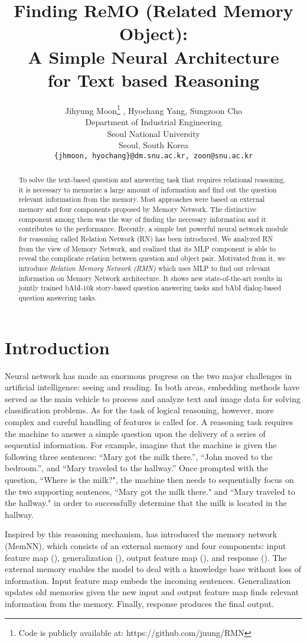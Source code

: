 \documentclass{article} \usepackage{iclr2018_conference,times}
\title{Finding ReMO (Related Memory Object): \\
A Simple Neural Architecture \\ for Text based Reasoning}
\author{Jihyung Moon\thanks{Code is publicly available at: https://github.com/juung/RMN} , Hyochang Yang, Sungzoon Cho \\
Department of Industrial Engineering\\
Seoul National University\\
Seoul, South Korea\\
\texttt{\{jhmoon, hyochang\}@dm.snu.ac.kr, zoon@snu.ac.kr}}
\begin{document}
\maketitle

\begin{abstract}
To solve the text-based question and answering task that requires relational reasoning, it is necessary to memorize a large amount of information and find out the question relevant information from the memory.
Most approaches were based on external memory and four components proposed by Memory Network.
The distinctive component among them was the way of finding the necessary information and it contributes to the performance.
Recently, a simple but powerful neural network module for reasoning called Relation Network (RN) has been introduced. 
We analyzed RN from the view of Memory Network, and realized that its MLP component is able to reveal the complicate relation between question and object pair.
Motivated from it, we introduce \textit{Relation Memory Network (RMN)} which uses MLP to find out relevant information on Memory Network architecture.
It shows new state-of-the-art results in jointly trained bAbI-10k story-based question answering tasks and bAbI dialog-based question answering tasks.
\end{abstract}

\section{Introduction}

Neural network has made an enormous progress on the two major challenges in artificial intelligence: seeing and reading.
In both areas, embedding methods have served as the main vehicle to process and analyze text and image data for solving classification problems. As for the task of logical reasoning, however, more complex and careful handling of features is called for.
A reasoning task requires the machine to answer a simple question upon the delivery of a series of sequential information. For example, imagine that the machine is given the following three sentences: ``Mary got the milk there.'',  ``John moved to the bedroom.'', and ``Mary traveled to the hallway.'' 
Once prompted with the question, ``Where is the milk?", the machine then needs to sequentially focus on the two supporting sentences, ``Mary got the milk there." and ``Mary traveled to the hallway." in order to successfully determine that the milk is located in the hallway.

Inspired by this reasoning mechanism, \citet{Weston15} has introduced the memory network (MemNN), which consists of an external memory and four components: input feature map (), generalization (), output feature map (), and response ().
The external memory enables the model to deal with a knowledge base without loss of information. 
Input feature map embeds the incoming sentences. Generalization updates old memories given the new input and output feature map finds relevant information from the memory. Finally, response produces the final output.
\end{document}
